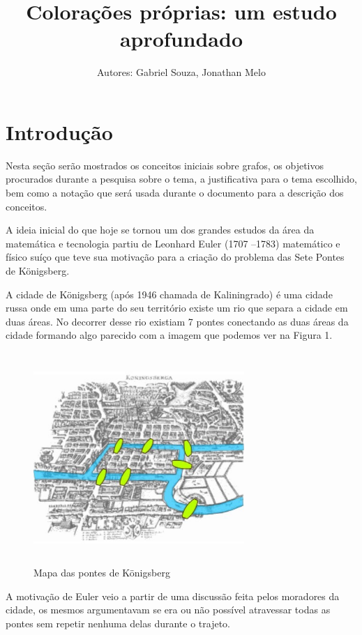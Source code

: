 \documentclass[12pt]{article}
\title{Colorações próprias: um estudo aprofundado}
\author{Autores: Gabriel Souza, Jonathan Melo}
\affil{Orientador: Prof. Celso A. Weffort-Santos }
\begin{document}
	
	\maketitle
	
	\section{Introdução}
	Nesta seção serão mostrados os conceitos iniciais sobre grafos, os objetivos procurados durante a pesquisa sobre o tema, a justificativa para o tema escolhido, bem como a notação que será usada durante o documento para a descrição dos conceitos.
	
	A ideia inicial do que hoje se tornou um dos grandes estudos da área da matemática e tecnologia partiu de Leonhard Euler (1707 –1783) matemático e físico suíço que teve sua motivação para a criação do problema das Sete Pontes de Königsberg.
	
	A cidade de Königsberg (após 1946 chamada de Kaliningrado) é uma cidade russa onde em uma parte do seu território existe um rio que separa a cidade em duas áreas. No decorrer desse rio existiam 7 pontes conectando as duas áreas da cidade formando algo parecido com a imagem que podemos ver na Figura 1.
	
	\begin{figure}[!htb]
		\centering
		\includegraphics[width=8cm, height=8cm]{pontesKonisberg}
		\caption{Mapa das pontes de Königsberg}    
	\end{figure}
	
	A motivação de Euler veio a partir de uma discussão feita pelos moradores da cidade, os mesmos argumentavam se era ou não possível atravessar todas as pontes sem repetir nenhuma delas durante o trajeto.
	
\end{document}
